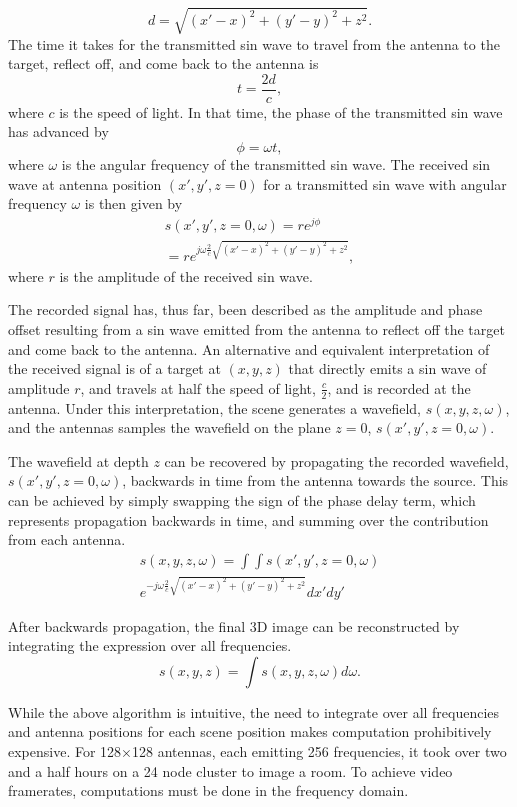\documentclass[twocolumn]{article}
\begin{document}
\[
d=\sqrt{(x'-x)^{2}+(y'-y)^{2}+z^{2}}.
\]
The time it takes for the transmitted sin wave to travel from the antenna to the target, reflect off, and come back to the antenna is
 \[
t=\frac{2d}{c},
\]
where $c$ is the speed of light. In that time, the phase of the transmitted sin wave has advanced by
\[
\phi = \omega t,
\]
where $\omega$ is the angular frequency of the transmitted sin wave. The received sin wave at antenna position $(x',y',z=0)$ for a transmitted sin wave with angular frequency $\omega$ is then given by
\begin{gather}
s(x',y',z=0,\omega) = re^{j\phi} \\
	= re^{j \omega \frac{2}{c} \sqrt{(x'-x)^2 + (y'-y)^2 + z^2}},
\end{gather}
where $r$ is the amplitude of the received sin wave.

The recorded signal has, thus far, been described as the amplitude and phase offset resulting from a sin wave emitted from the antenna to reflect off the target and come back to the antenna. An alternative and equivalent interpretation of the received signal is of a target at $(x,y,z)$ that directly emits a sin wave of amplitude $r$, and travels at half the speed of light, $\frac{c}{2}$, and is recorded at the antenna. Under this interpretation, the scene generates a wavefield, $s(x,y,z,\omega)$, and the antennas samples the wavefield on the plane $z=0$, $s(x',y',z=0,\omega)$. 

The wavefield at depth $z$ can be recovered by propagating the recorded wavefield, $s(x',y',z=0,\omega)$, backwards in time from the antenna towards the source. This can be achieved by simply swapping the sign of the phase delay term, which represents propagation backwards in time, and summing over the contribution from each antenna.
\begin{gather}
s(x,y,z,\omega) =\int\int s(x',y',z=0,\omega) \\
e^{-j \omega \frac{2}{c} \sqrt{(x'-x)^{2}+(y'-y)^{2}+z^{2}}} dx'dy'
\end{gather}

After backwards propagation, the final 3D image can be reconstructed by integrating the expression over all frequencies.
\[
s(x,y,z)=\int s(x,y,z,\omega) d\omega.
\]

While the above algorithm is intuitive, the need to integrate over all frequencies and antenna positions for each scene position makes computation prohibitively expensive. For 128$\times$128 antennas, each emitting 256 frequencies, it took over two and a half hours on a 24 node cluster to image a room. To achieve video framerates, computations must be done in the frequency domain.
\end{document}
